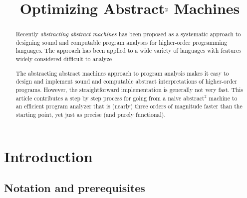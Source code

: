 \documentclass[preprint]{sigplanconf}
\begin{document}
\copyrightdata{[to be supplied]} 


\title{Optimizing Abstract$^{\text 2}$ Machines}

\authorinfo{}{}{}

\maketitle

\begin{abstract}
Recently \emph{abstracting abstract machines} has been proposed as a
systematic approach to designing sound and computable program analyses
for higher-order programming languages.  The approach has been applied
to a wide variety of languages with features widely considered
difficult to analyze


The abstracting abstract machines approach to program analysis makes
it easy to design and implement sound and computable abstract
interpretations of higher-order programs.
%
However, the straightforward implementation is generally
not very fast.
%
This article contributes a step by step process for going from a naive
abstract$^2$ machine to an efficient program analyzer that is (nearly)
three orders of magnitude faster than the starting point, yet just as
precise (and purely functional).
\end{abstract}




\section{Introduction}

\subsection{Notation and prerequisites}
\end{document}
